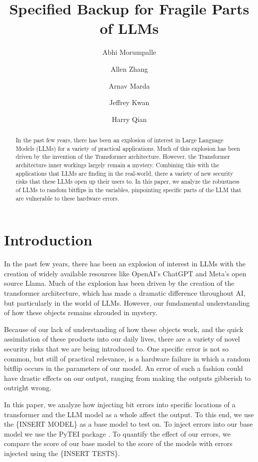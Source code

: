 \documentclass[a4paper]{article}
\title{Specified Backup for Fragile Parts of LLMs}
\author{
Abhi Morumpalle
\and
Allen Zhang
\and
Arnav Marda
\and
Jeffrey Kwan
\and
Harry Qian
}
\begin{document}
\maketitle

\begin{abstract}
In the past few years, there has been an explosion of interest in Large Language Models (LLMs) for a variety of practical applications. Much of this explosion has been driven by the invention of the Transformer architecture. However, the Transformer architecture inner workings largely remain a mystery. Combining this with the applications that LLMs are finding in the real-world, there a variety of new security risks that these LLMs open
up their users to. In this paper, we analyze the robustness of LLMs to random bitflips in the variables, pinpointing specific parts of the LLM that are vulnerable to these hardware errors.


\end{abstract}


\section{Introduction}

In the past few years, there has been an explosion of interest in LLMs with the creation of widely available resources like OpenAI's ChatGPT
and Meta's open source Llama. Much of the explosion has been driven by the creation of the transformer architecture, which has made a dramatic difference throughout AI, but particularly in the world of LLMs. However, our fundamental understanding of how these objects remains shrouded in mystery.

Because of our lack of understanding of how these objects work, and the quick assimilation of these products into our daily lives, there are a variety of novel security risks that we are being introduced to. One specific error is not so common, but still of practical relevance, is a hardware failure in which a random bitflip occurs in the parameters of our model. An error of such a fashion could have drastic effects on our output, ranging from making the outputs gibberish to outright wrong.

In this paper, we analyze how injecting bit errors into specific locations of a transformer and the LLM model as a whole affect the output. To this end, we use the \{INSERT MODEL\} as a base model to test on. To inject errors into our base model we use the PyTEI package \cite{Ma23}. To quantify the effect of our errors, we compare the score of our base model to the score of the models with errors injected using the \{INSERT TESTS\}.
\end{document}

